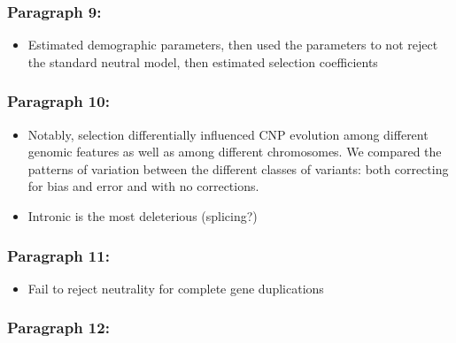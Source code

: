 \documentclass[]{book}
\providecommand{\tightlist}{%
  \setlength{\itemsep}{0pt}\setlength{\parskip}{0pt}}
\begin{document}
\hypertarget{paragraph-9}{%
\subsubsection{Paragraph 9:}\label{paragraph-9}}

\begin{itemize}
\tightlist
\item
  Estimated demographic parameters, then used the parameters to not reject the standard neutral model, then estimated selection coefficients
\end{itemize}

\hypertarget{paragraph-10}{%
\subsubsection{Paragraph 10:}\label{paragraph-10}}

\begin{itemize}
\tightlist
\item
  Notably, selection differentially influenced CNP evolution among different genomic features as well as among different chromosomes. We compared the patterns of variation between the different classes of variants: both correcting for bias and error and with no corrections.
\item
  Intronic is the most deleterious (splicing?)
\end{itemize}

\hypertarget{paragraph-11}{%
\subsubsection{Paragraph 11:}\label{paragraph-11}}

\begin{itemize}
\tightlist
\item
  Fail to reject neutrality for complete gene duplications
\end{itemize}

\hypertarget{paragraph-12}{%
\subsubsection{Paragraph 12:}\label{paragraph-12}}
\end{document}

